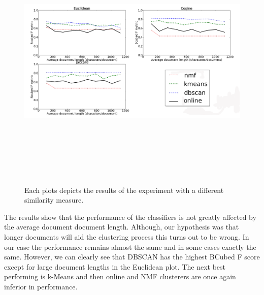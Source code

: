 \begin{figure}[htbp]
  \begin{center}
    \includegraphics[height=5in, width=6in]{average_document_length}
    \caption{Each plots depicts the results of the experiment with a different similarity measure.}
    \label{DifferentLengthResults}
  \end{center}
\end{figure}
The results show that the performance of the classifiers is not greatly affected by the average document document length. Although, our hypothesis was that longer documents will aid the clustering process this turns out to be wrong. In our case the performance remains almost the same and in some cases exactly the same. However, we can clearly see that DBSCAN has the highest BCubed F score except for large document lengths in the Euclidean plot. The next best performing is k-Means and then online and NMF clusterers are once again inferior in performance.    


